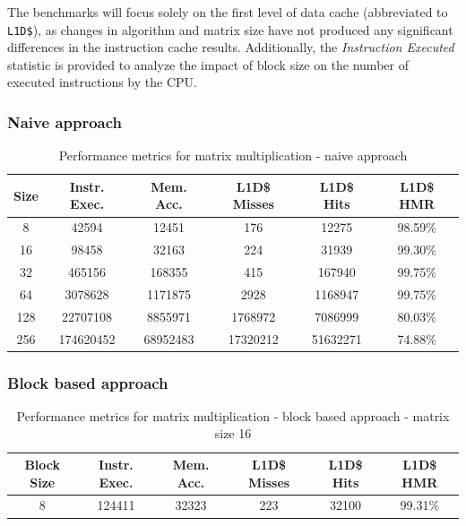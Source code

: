 \noindent The benchmarks will focus solely on the first level of data cache (abbreviated to \texttt{L1D\$}), as changes in algorithm and matrix size have not produced any
significant differences in the instruction cache results. Additionally, the \textit{Instruction Executed} statistic is provided to analyze the impact of block size on the number of
executed instructions by the CPU.

\subsubsection{Naive approach}

\begin{center}
\begin{table}[h!]
\centering
\begin{tabular}{|c|c|c|c|c|c|}
\hline
\textbf{Size} & \textbf{Instr. Exec.} & \textbf{Mem. Acc.} & \textbf{L1D\$ Misses} & \textbf{L1D\$ Hits} & \textbf{L1D\$ HMR} \\ \hline
8 & 42594 & 12451 & 176 & 12275 & 98.59\% \\ \hline
16 & 98458 & 32163 & 224 & 31939 & 99.30\% \\ \hline
32 & 465156 & 168355 & 415 & 167940 & 99.75\% \\ \hline
64 & 3078628 & 1171875 & 2928 & 1168947 & 99.75\% \\ \hline
128 & 22707108 & 8855971 & 1768972 & 7086999 & 80.03\% \\ \hline
256 & 174620452 & 68952483 & 17320212 & 51632271 & 74.88\% \\ \hline
\end{tabular}
\caption{Performance metrics for matrix multiplication - naive approach}
\label{tab:performance_metrics}
\end{table}
\end{center}

\subsubsection{Block based approach}

\begin{center}
\begin{table}[!htbp]
\centering
\begin{tabular}{|c|c|c|c|c|c|}
\hline
\textbf{Block Size} & \textbf{Instr. Exec.} & \textbf{Mem. Acc.} & \textbf{L1D\$ Misses} & \textbf{L1D\$ Hits} & \textbf{L1D\$ HMR} \\ \hline
8 & 124411 & 32323 & 223 & 32100 & 99.31\% \\ \hline
\end{tabular}
\caption{Performance metrics for matrix multiplication - block based approach - matrix size 16}
\label{tab:performance_metrics_16}
\end{table}
\end{center}

